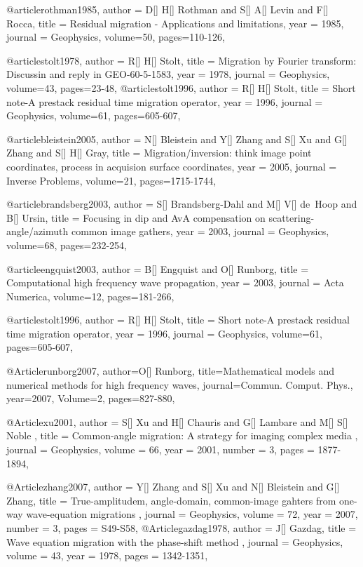 {@article{rothman1985,
  author =	 {D[] H[] Rothman and S[] A[] Levin and F[] Rocca},
  title =	 {Residual  migration - Applications and limitations},
  year =	 1985,
  journal =	 {Geophysics},
  volume={50},
 pages=110-126,
}

@article{stolt1978,
  author =	 {R[] H[] Stolt},
  title =	 {Migration by Fourier transform: Discussin and reply in GEO-60-5-1583},
  year =	 1978,
  journal =	 {Geophysics},
  volume={43},
 pages=23-48,
}
@article{stolt1996,
  author =	 {R[] H[] Stolt},
  title =	 {Short note-A prestack residual time migration operator},
  year =	 1996,
  journal =	 {Geophysics},
  volume={61},
 pages=605-607,
}

@article{bleistein2005,
  author =	 {N[] Bleistein and Y[] Zhang and S[] Xu and G[] Zhang and S[] H[] Gray},
  title =	 {Migration/inversion: think image point coordinates, process in acquision surface coordinates},
  year =	 2005,
  journal =	 {Inverse Problems},
  volume={21},
 pages=1715-1744,
}

@article{brandsberg2003,
  author =	 {S[] Brandsberg-Dahl and M[] V[] de~Hoop and B[] Ursin},
  title =	 {Focusing in dip and AvA compensation on scattering-angle/azimuth common image gathers},
  year =	 2003,
  journal =	 {Geophysics},
  volume={68},
 pages=232-254,
}

@article{engquist2003,
  author =	 {B[] Engquist and O[] Runborg},
  title =	 {Computational high frequency wave propagation},
  year =	 2003,
  journal =	 {Acta Numerica},
  volume={12},
 pages=181-266,
}

@article{stolt1996,
  author =	 {R[] H[] Stolt},
  title =	 {Short note-A prestack residual time migration operator},
  year =	 1996,
  journal =	 {Geophysics},
  volume={61},
 pages=605-607,
}

@Article{runborg2007,
  author={O[] Runborg},
  title={Mathematical models and numerical methods for high frequency waves},
  journal={Commun. Comput. Phys.},
  year=2007,
  Volume=2,
  pages={827-880},
}

@Article{xu2001,
  author =	 { S[] Xu and H[] Chauris and G[] Lambare and M[] S[] Noble },
  title =	 { Common-angle migration: A strategy for imaging complex media },
  journal =	 {Geophysics},
  volume =	 66,
  year =	 2001,
  number =	 3,
  pages =	 {1877-1894},
}

@Article{zhang2007,
  author =	 { Y[] Zhang and S[] Xu and N[] Bleistein and G[] Zhang},
  title =	 { True-amplitudem, angle-domain, common-image gahters from one-way wave-equation migrations },
  journal =	 {Geophysics},
  volume =	 72,
  year =	 2007,
  number =	 3,
  pages =	 {S49-S58},
}
@Article{gazdag1978,
  author =	 { J[] Gazdag},
  title =	 { Wave equation migration with the phase-shift method },
  journal =	 {Geophysics},
  volume =	 43,
  year =	 1978,
  pages =	 {1342-1351},
}

}
